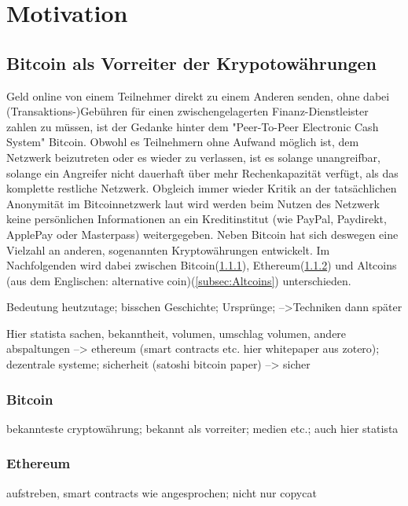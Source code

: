 \chapter{Motivation}


\section{Bitcoin als Vorreiter der Krypotowährungen}
Geld online von einem Teilnehmer direkt zu einem Anderen senden, ohne dabei (Transaktions-)Gebühren für einen zwischengelagerten Finanz-Dienstleister zahlen zu müssen, ist der Gedanke hinter dem "Peer-To-Peer Electronic Cash System"\citep{nakamoto_bitcoin:_2008} Bitcoin. Obwohl es Teilnehmern ohne Aufwand möglich ist, dem Netzwerk beizutreten oder es wieder zu verlassen, ist es solange unangreifbar, solange ein Angreifer nicht dauerhaft über mehr Rechenkapazität verfügt, als das komplette restliche Netzwerk.\citep{nakamoto_bitcoin:_2008} Obgleich immer wieder Kritik an der tatsächlichen Anonymität im Bitcoinnetzwerk laut wird\citep{reid_analysis_2013,androulaki_evaluating_2013} werden beim Nutzen des Netzwerk keine persönlichen Informationen an ein Kreditinstitut (wie PayPal, Paydirekt, ApplePay oder Masterpass) weitergegeben.\newline
Neben Bitcoin hat sich deswegen eine Vielzahl an anderen, sogenannten Kryptowährungen entwickelt. Im Nachfolgenden wird dabei zwischen Bitcoin(\ref{subsec:Bitcoin}), Ethereum(\ref{subsec:Ethereum})\citep{wood_ethereum:_2014} und Altcoins (aus dem Englischen: alternative coin\citep{prableen_bajpai_altcoin_2014})(\ref{subsec:Altcoins}) unterschieden.




Bedeutung heutzutage; bisschen Geschichte; Ursprünge; -->Techniken dann später

Hier statista sachen, bekanntheit, volumen, umschlag volumen, andere abspaltungen --> ethereum (smart contracts etc. hier whitepaper aus zotero);
dezentrale systeme; sicherheit (satoshi bitcoin paper) --> sicher


\subsection{Bitcoin}\label{subsec:Bitcoin}

bekannteste cryptowährung; bekannt als vorreiter; medien etc.; auch hier statista


\subsection{Ethereum}\label{subsec:Ethereum}
aufstreben, smart contracts wie angesprochen; nicht nur copycat


